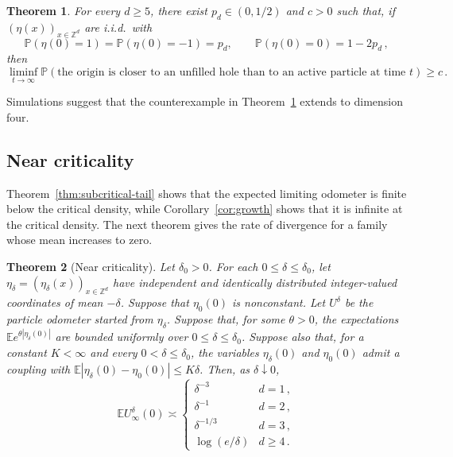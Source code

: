 \documentclass[11pt]{amsart}
\theoremstyle{plain}
\newtheorem{theorem}{Theorem}[section]
\theoremstyle{definition}
\newcommand{\Z}{\mathbb{Z}}
\newcommand{\E}{\mathbb{E}}
\renewcommand{\P}{\mathbb{P}}
\begin{document}
\begin{theorem}\label{thm:nearest-counterexample}
	For every $d\geq5$, there exist $p_d\in(0,1/2)$ and $c>0$ such that, if
	$(\eta(x))_{x\in\Z^d}$ are i.i.d.\ with
	\begin{equation}\label{eq:nearest-counterexample-law}
		\P(\eta(0)=1)=\P(\eta(0)=-1)=p_d,\qquad
		\P(\eta(0)=0)=1-2p_d\,,
	\end{equation}
	then
	     \begin{equation}\label{eq:nearest-counterexample}
		\liminf_{t\to\infty}
		\P(\text{the origin is closer to an unfilled hole than to an active
		particle at time }t)\geq c\,.
	\end{equation}
\end{theorem}
Simulations suggest that the counterexample in
Theorem~\ref{thm:nearest-counterexample} extends to dimension four.


\subsection{Near criticality}\label{ssec:results-near}

Theorem~\ref{thm:subcritical-tail} shows that the expected limiting odometer is finite
below the critical density, while Corollary~\ref{cor:growth} shows that it is infinite
at the critical density. The next theorem gives the rate of divergence for a
family whose mean increases to zero.

\begin{theorem}[Near criticality]\label{thm:near}
	Let $\delta_0>0$. For each $0\leq\delta\leq\delta_0$, let
	$\eta_\delta=(\eta_\delta(x))_{x\in\Z^d}$ have independent and identically
	distributed integer-valued coordinates of mean $-\delta$. Suppose that
	$\eta_0(0)$ is nonconstant. Let $U^\delta$ be the particle odometer started
	from $\eta_\delta$.
	Suppose that, for some $\theta>0$, the expectations
	$\E e^{\theta|\eta_\delta(0)|}$ are bounded uniformly over
	$0\leq\delta\leq\delta_0$. Suppose also that, for a constant $K<\infty$ and every
	$0<\delta\leq\delta_0$, the variables $\eta_\delta(0)$ and $\eta_0(0)$ admit a coupling
	with $\E|\eta_\delta(0)-\eta_0(0)|\leq K\delta$. Then, as
	$\delta\downarrow0$,
	\begin{equation}\label{eq:near}
		\E U_\infty^\delta(0)\asymp
		\begin{cases}
			\delta^{-3}&d=1\,,\\
			\delta^{-1}&d=2\,,\\
			\delta^{-1/3}&d=3\,,\\
			\log(e/\delta)&d\geq4\,.
		\end{cases}
	\end{equation}
\end{theorem}
\end{document}
